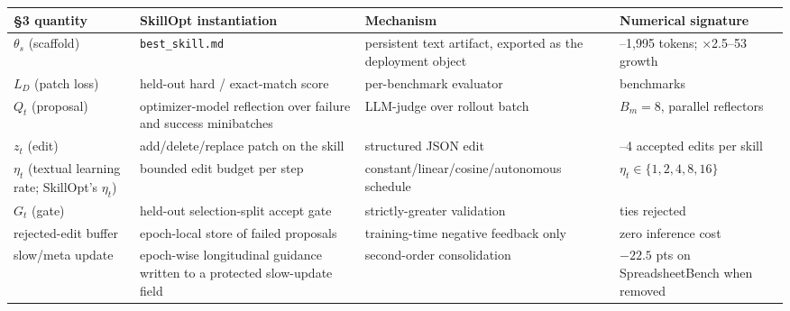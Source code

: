 \documentclass[
]{article}
\newcounter{none} %
\begin{document}
{\def\LTcaptype{none} %
\begin{longtable}[]{@{}
  >{\raggedright\arraybackslash}p{}
  >{\raggedright\arraybackslash}p{}
  >{\raggedright\arraybackslash}p{}
  >{\raggedright\arraybackslash}p{}@{}}
\toprule\noalign{}
\begin{minipage}[b]{\linewidth}\raggedright
§3 quantity
\end{minipage} & \begin{minipage}[b]{\linewidth}\raggedright
SkillOpt instantiation
\end{minipage} & \begin{minipage}[b]{\linewidth}\raggedright
Mechanism
\end{minipage} & \begin{minipage}[b]{\linewidth}\raggedright
Numerical signature
\end{minipage} \\
\midrule\noalign{}
\endhead
\bottomrule\noalign{}
\endlastfoot
\(\theta_s\) (scaffold) & \texttt{best\_skill.md} & persistent text
artifact, exported as the deployment object & 379--1,995 tokens;
×2.5--53 growth \\
\(L_D\) (patch loss) & held-out hard / exact-match score & per-benchmark
evaluator & 6 benchmarks \\
\(Q_t\) (proposal) & optimizer-model reflection over failure and success
minibatches & LLM-judge over rollout batch & \(B_m{=}8\), parallel
reflectors \\
\(z_t\) (edit) & add/delete/replace patch on the skill & structured JSON
edit & 1--4 accepted edits per skill \\
\(\eta_t\) (textual learning rate; SkillOpt's \(\eta_t\)) & bounded edit
budget per step & constant/linear/cosine/autonomous schedule &
\(\eta_t \in \{1,2,4,8,16\}\) \\
\(G_t\) (gate) & held-out selection-split accept gate & strictly-greater
validation & ties rejected \\
rejected-edit buffer & epoch-local store of failed proposals &
training-time negative feedback only & zero inference cost \\
slow/meta update & epoch-wise longitudinal guidance written to a
protected slow-update field & second-order consolidation & \(-22.5\) pts
on SpreadsheetBench when removed \\
\end{longtable}
}
\end{document}
